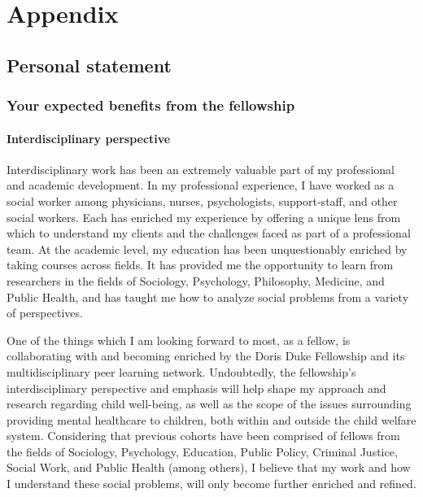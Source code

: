 \documentclass[twocolumn, serif, rga, authordate]{jote-article}
\begin{document}
\nocite{*}

\printbibliography
\license
\newpage
\section*{Appendix}





\subsection*{Personal statement}



\subsubsection*{Your expected benefits from the fellowship}



\paragraph{Interdisciplinary perspective}


Interdisciplinary work has been an extremely valuable part of my
professional and academic development. In my professional experience, I
have worked as a social worker among physicians, nurses, psychologists,
support-staff, and other social workers. Each has enriched my experience
by offering a unique lens from which to understand my clients and the
challenges faced as part of a professional team. At the academic level,
my education has been unquestionably enriched by taking courses across
fields. It has provided me the opportunity to learn from researchers in
the fields of Sociology, Psychology, Philosophy, Medicine, and Public
Health, and has taught me how to analyze social problems from a variety
of perspectives.

One of the things which I am looking forward to most, as a fellow, is
collaborating with and becoming enriched by the Doris Duke Fellowship
and its multidisciplinary peer learning network. Undoubtedly, the
fellowship's interdisciplinary perspective and emphasis will help shape
my approach and research regarding child well-being, as well as the
scope of the issues surrounding providing mental healthcare to children,
both within and outside the child welfare system. Considering that
previous cohorts have been comprised of fellows from the fields of
Sociology, Psychology, Education, Public Policy, Criminal Justice,
Social Work, and Public Health (among others), I believe that my work
and how I understand these social problems, will only become further
enriched and refined.
\end{document}
